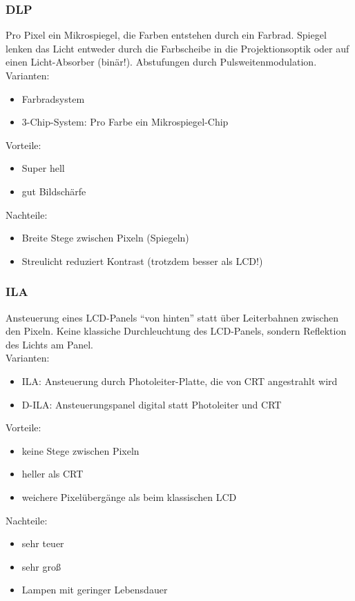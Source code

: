 \documentclass[a4paper, 12pt]{article}
\begin{document}
\subsubsection*{DLP}
Pro Pixel ein Mikrospiegel, die Farben entstehen durch ein Farbrad. Spiegel lenken das Licht entweder durch die Farbscheibe in die Projektionsoptik oder auf einen Licht-Absorber (binär!). Abstufungen durch Pulsweitenmodulation.\\
Varianten:
\begin{itemize}
  \item Farbradsystem
  \item 3-Chip-System: Pro Farbe ein Mikrospiegel-Chip
\end{itemize}
Vorteile:
\begin{itemize}
  \item Super hell
  \item gut Bildschärfe
\end{itemize}
Nachteile:
\begin{itemize}
  \item Breite Stege zwischen Pixeln (Spiegeln)
  \item Streulicht reduziert Kontrast (trotzdem besser als LCD!)
\end{itemize}

\subsubsection*{ILA}
Ansteuerung eines LCD-Panels ``von hinten'' statt über Leiterbahnen zwischen den Pixeln. Keine klassiche Durchleuchtung des LCD-Panels, sondern Reflektion des Lichts am Panel.\\
Varianten:
\begin{itemize}
  \item ILA: Ansteuerung durch Photoleiter-Platte, die von CRT angestrahlt wird
  \item D-ILA: Ansteuerungspanel digital statt Photoleiter und CRT
\end{itemize}
Vorteile:
\begin{itemize}
  \item keine Stege zwischen Pixeln
  \item heller als CRT
  \item weichere Pixelübergänge als beim klassischen LCD
\end{itemize}
Nachteile:
\begin{itemize}
  \item sehr teuer
  \item sehr groß
  \item Lampen mit geringer Lebensdauer
\end{itemize}
\end{document}
